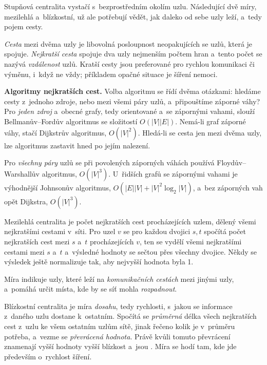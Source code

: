 \documentclass[11pt,a4paper]{article}
\theoremstyle{definition}
\begin{document}
Stupňová centralita vystačí s~bezprostředním okolím uzlu. Následující dvě míry, mezilehlá
a~blízkostní, už ale potřebují vědět, jak daleko od sebe uzly leží, a~tedy pojem cesty.

\begin{defbox}
\emph{Cesta} mezi dvěma uzly je libovolná posloupnost neopakujících se uzlů, která je spojuje.
\emph{Nejkratší cesta} spojuje dva uzly nejmenším počtem hran a~tento počet se nazývá
\emph{vzdálenost} uzlů. Kratší cesty jsou preferované pro rychlou komunikaci či výměnu,
i~když ne vždy; příkladem opačné situace je šíření nemoci.

\textbf{Algoritmy nejkratších cest.} Volba algoritmu se řídí dvěma otázkami: hledáme cesty
z~jednoho zdroje, nebo mezi všemi páry uzlů, a~připouštíme záporné váhy? Pro \emph{jeden
zdroj} a~obecné grafy, tedy orientované a~se zápornými vahami, slouží Bellmanův--Fordův
algoritmus se složitostí $O(|V||E|)$. Nemá-li graf záporné váhy, stačí Dijkstrův algoritmus,
$O(|V|^2)$. Hledá-li se cesta jen mezi dvěma uzly, lze algoritmus zastavit hned po jejím
nalezení.

Pro \emph{všechny páry} uzlů se při povolených záporných váhách používá Floydův--Warshallův
algoritmus, $O(|V|^3)$. U~řidších grafů se zápornými vahami je výhodnější Johnsonův
algoritmus, $O(|E||V|+|V|^2\log_2|V|)$, a~bez záporných vah opět Dijkstra, $O(|V|^3)$.
\end{defbox}

\begin{defbox}
Mezilehlá centralita je počet nejkratších cest procházejících uzlem, dělený všemi nejkratšími
cestami v~síti. Pro uzel $v$ se pro každou dvojici $s,t$ spočítá počet nejkratších cest mezi
$s$ a~$t$ procházejících $v$, ten se vydělí všemi nejkratšími cestami mezi $s$ a~$t$
a~výsledné hodnoty se sečtou přes všechny dvojice. Někdy se výsledek ještě normalizuje tak,
aby nejvyšší hodnota byla 1.

Míra indikuje uzly, které leží na \emph{komunikačních cestách} mezi jinými uzly, a~pomáhá
určit místa, kde by se síť mohla \emph{rozpadnout}.
\end{defbox}

\begin{defbox}
Blízkostní centralita je míra \emph{dosahu}, tedy rychlosti, s~jakou se informace z~daného
uzlu dostane k~ostatním. Spočítá se \emph{průměrná} délka všech nejkratších cest z~uzlu ke
všem ostatním uzlům sítě, jinak řečeno kolik  je v~průměru potřeba, a~vezme se
\emph{převrácená hodnota}. Právě kvůli tomuto převrácení znamenají vyšší hodnoty vyšší
blízkost a~jsou . Míra se hodí tam, kde jde především o~rychlost šíření.
\end{defbox}
\end{document}
